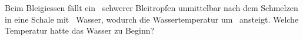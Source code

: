 Beim Bleigiessen fällt ein \mPbO\ schwerer Bleitropfen unmittelbar nach dem Schmelzen in eine Schale mit \VWO\ Wasser, wodurch die Wassertemperatur um \dTO\ ansteigt. Welche Temperatur hatte das Wasser zu Beginn?
